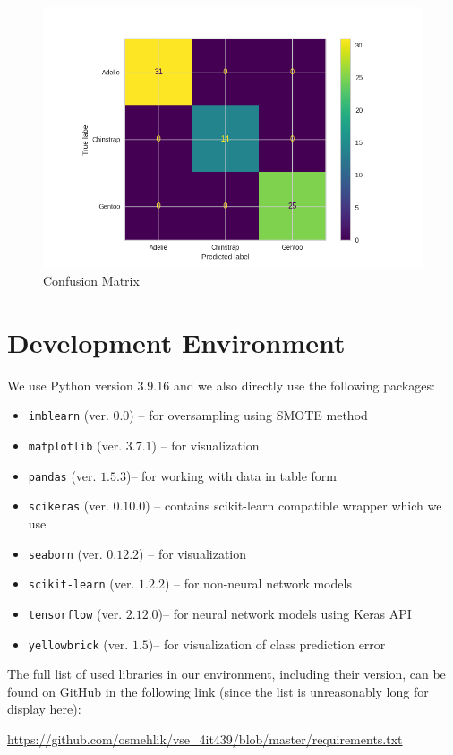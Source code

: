 \documentclass[12pt,a4paper]{article}
\begin{document}
\begin{figure}
	\centering
	\includegraphics[width=0.7\linewidth]{fig_confusion_matrix}
	\caption{Confusion Matrix}
	\label{fig:figconfusionmatrix}
\end{figure}

\section{Development Environment}

We use Python version 3.9.16 and we also directly use the following packages:

\begin{itemize}
\item \texttt{imblearn} (ver. $0.0$) -- for oversampling using SMOTE method
\item \texttt{matplotlib} (ver. $3.7.1$) -- for visualization
\item \texttt{pandas} (ver. $1.5.3$)-- for working with data in table form
\item \texttt{scikeras} (ver. $0.10.0$) -- contains scikit-learn compatible wrapper which we use
\item \texttt{seaborn} (ver. $0.12.2$) -- for visualization
\item \texttt{scikit-learn} (ver. $1.2.2$) -- for non-neural network models
\item \texttt{tensorflow} (ver. $2.12.0$)-- for neural network models using Keras API
\item \texttt{yellowbrick} (ver. $1.5$)-- for visualization of class prediction error
\end{itemize}

The full list of used libraries in our environment, including their version, can be found on GitHub in the following link (since the list is unreasonably long for display here):

\medskip
\noindent
\url{https://github.com/osmehlik/vse_4it439/blob/master/requirements.txt}

\printbibliography
\end{document}
